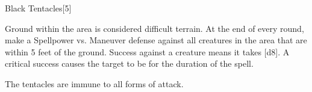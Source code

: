 \begin{spellsection}{Black Tentacles}[5]
    \begin{spellheader}
    \end{spellheader}
    \begin{spellcontent}
        \begin{spelltargetinginfo}
        \end{spelltargetinginfo}
        \begin{spelleffects}
            \spelleffect Ground within the area is considered difficult terrain. At the end of every round, make a Spellpower vs. Maneuver defense against all creatures in the area that are within 5 feet of the ground. Success against a creature means it takes [d8]. A critical success causes the target to be \immobilized for the duration of the spell.
            \spelldur \durshort
        \end{spelleffects}
    \end{spellcontent}
    \begin{spellfooter}
        \spellnotes The tentacles are immune to all forms of attack.
        \miscastyou
    \end{spellfooter}
    \begin{spellaugments}
    \end{spellaugments}
\end{spellsection}

